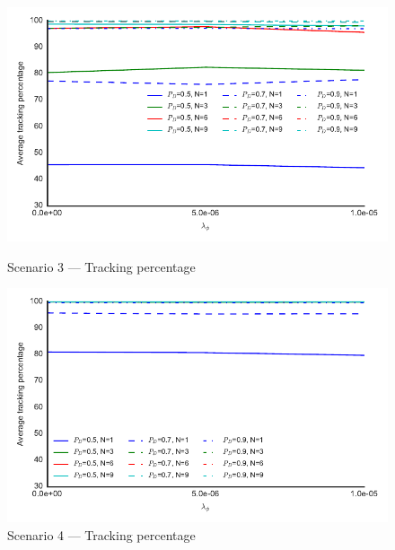 \begin{figure}
\centering
\includegraphics{Figures/plots/Scenario3_Tracking-TrackingPercentage.pdf}
\caption{Scenario 3 --- Tracking percentage}\label{fig:scenario3_tracking_percentage}

\includegraphics{Figures/plots/Scenario4_Tracking-TrackingPercentage.pdf}
\caption{Scenario 4 --- Tracking percentage}\label{fig:scenario4_tracking_percentage}
\end{figure}
